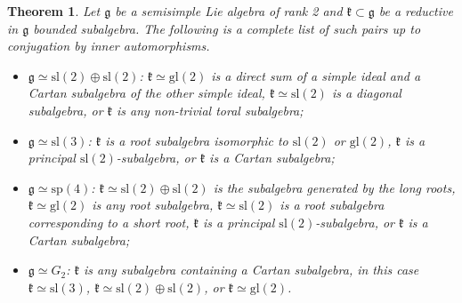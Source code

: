 \documentclass[12pt]{amsart}
\theoremstyle{plain} %
\newtheorem{theorem}[definition]{Theorem}
\renewcommand{\sl}{\mathrm{sl}}
\newcommand{\gl}{\mathrm{gl}}
\renewcommand{\sp}{\mathrm{sp}}
\newcommand{\kk}{\mathfrak{k}}
\renewcommand{\gg}{\mathfrak{g}}
\begin{document}
\begin{theorem}\label{thPairsList}
Let $\gg$ be a semisimple Lie algebra of rank 2 and $\kk\subset\gg$ be a reductive in $\gg$ bounded subalgebra. The following is a complete list of such pairs up to conjugation by inner automorphisms.
\begin{itemize}
\item[(1)] $\gg\simeq\sl(2)\oplus\sl(2)$: $\kk\simeq \gl(2)$ is a direct sum of a simple ideal and a Cartan subalgebra of the other simple ideal,
$\kk\simeq\sl(2)$ is a
  diagonal subalgebra, or $\kk$ is any non-trivial toral subalgebra;
\item[(2)] $\gg\simeq\sl(3)$: $\kk$ is a root subalgebra isomorphic to $\sl(2)$ or $\gl(2)$, $\kk$ is a principal   $\sl(2)$-subalgebra, or $\kk$ is a Cartan subalgebra;
\item[(3)] $\gg\simeq\sp(4)$: $\kk \simeq \sl(2)\oplus \sl(2)$ is the subalgebra generated by the long roots, $\kk \simeq \gl(2)$ is any root subalgebra, $\kk\simeq \sl(2)$ is a root   subalgebra corresponding to a short root, $\kk$ is a principal $\sl(2)$-subalgebra, or $\kk$ is a Cartan subalgebra;
\item[(4)] $\gg\simeq G_2$: $\kk$ is any subalgebra containing a Cartan subalgebra, in this case $\kk\simeq \sl(3)$, $\kk\simeq\sl(2)\oplus\sl(2)$, or $\kk\simeq \gl(2)$.
\end{itemize}
\end{theorem}
\end{document}
